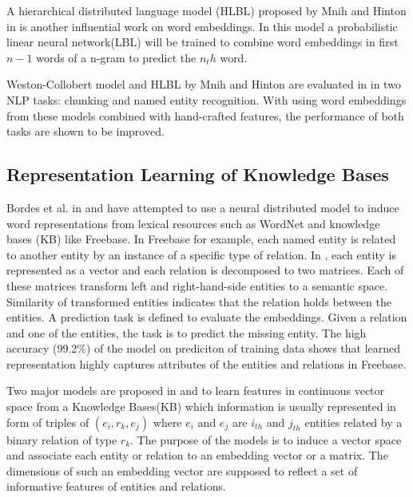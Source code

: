 A hierarchical distributed language model (HLBL) proposed by Mnih and
Hinton in \cite{Mnih2009} is another influential work on word embeddings. In
this model a probabilistic linear neural network(LBL) will be trained to 
combine word embeddings in first $n-1$ words of a n-gram to predict the $n_th$ word.

Weston-Collobert model and HLBL by Mnih and Hinton are evaluated in
\cite{Turian2010b} in two NLP tasks: chunking and named entity recognition. With
using word embeddings from these models combined with hand-crafted features, the
performance of both tasks are shown to be improved.
 
\subsection{Representation Learning of Knowledge Bases}
\label{sec: repr-learning-kb}
Bordes et al. in \cite{Bordes2011} and \cite{Bordes2012} have attempted to use
a neural distributed model to induce word representations from lexical resources
such as WordNet and knowledge bases (KB) like Freebase. In Freebase for example, each named entity is related
to another entity by an instance of a specific type of relation. In
\cite{Bordes2011}, each entity is represented as a vector and each relation is decomposed to two
matrices. Each of these matrices transform left and right-hand-side entities
to a semantic space. Similarity of transformed entities indicates that the
relation holds between the entities.  A prediction task is defined to evaluate
the embeddings. Given a relation and one of the entities, the task is to predict
the missing entity. The high accuracy (99.2\%) of the model on prediciton
of training data shows that learned representation highly captures attributes of
the entities and relations in Freebase.

Two major models are proposed in \cite{Bordes2011} and \cite{Bordes2012} to
learn features in continuous  vector space from a Knowledge Bases(KB) which information is
usually represented in form of triples of $(e_{i},r_{k} , e_{j} )$ where $e_{i}$ and $e_{j}$ are $i_{th}$ and $j_{th}$ entities related
 by a binary relation of type $r_{k}$. The purpose of the models is to induce a vector space and associate
  each entity or relation to an embedding vector or a matrix.
  The dimensions of such an embedding vector are supposed to reflect a set of informative features of entities and relations.
   
